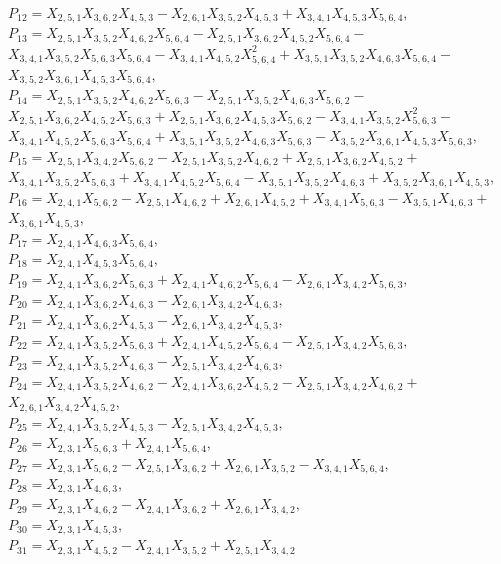\documentclass[10pt]{beamer}
\begin{document}
{$P_{12}=X_{2,5,1}X_{3,6,2}X_{4,5,3}-X_{2,6,1}X_{3,5,2}X_{4,5,3}+X_{3,4,1}X_{4,5,3}X_{5,6,4},$\\
$P_{13}=X_{2,5,1}X_{3,5,2}X_{4,6,2}X_{5,6,4}-X_{2,5,1}X_{3,6,2}X_{4,5,2}X_{5,6,4}-$\\
$X_{3,4,1}X_{3,5,2}X_{5,6,3}X_{5,6,4}-X_{3,4,1}X_{4,5,2}X_{5,6,4}^2+X_{3,5,1}X_{3,5,2}X_{4,6,3}X_{5,6,4}-$\\
$X_{3,5,2}X_{3,6,1}X_{4,5,3}X_{5,6,4},$\\
$P_{14}=X_{2,5,1}X_{3,5,2}X_{4,6,2}X_{5,6,3}-X_{2,5,1}X_{3,5,2}X_{4,6,3}X_{5,6,2}-$\\
$X_{2,5,1}X_{3,6,2}X_{4,5,2}X_{5,6,3}+X_{2,5,1}X_{3,6,2}X_{4,5,3}X_{5,6,2}-X_{3,4,1}X_{3,5,2}X_{5,6,3}^2-$\\
$X_{3,4,1}X_{4,5,2}X_{5,6,3}X_{5,6,4}+X_{3,5,1}X_{3,5,2}X_{4,6,3}X_{5,6,3}-X_{3,5,2}X_{3,6,1}X_{4,5,3}X_{5,6,3},$\\
$P_{15}=X_{2,5,1}X_{3,4,2}X_{5,6,2}-X_{2,5,1}X_{3,5,2}X_{4,6,2}+X_{2,5,1}X_{3,6,2}X_{4,5,2}+$\\
$X_{3,4,1}X_{3,5,2}X_{5,6,3}+X_{3,4,1}X_{4,5,2}X_{5,6,4}-X_{3,5,1}X_{3,5,2}X_{4,6,3}+X_{3,5,2}X_{3,6,1}X_{4,5,3},$\\
$P_{16}=X_{2,4,1}X_{5,6,2}-X_{2,5,1}X_{4,6,2}+X_{2,6,1}X_{4,5,2}+X_{3,4,1}X_{5,6,3}-X_{3,5,1}X_{4,6,3}+$\\
$X_{3,6,1}X_{4,5,3},$\\
$P_{17}=X_{2,4,1}X_{4,6,3}X_{5,6,4},$\\
$P_{18}=X_{2,4,1}X_{4,5,3}X_{5,6,4},$\\
$P_{19}=X_{2,4,1}X_{3,6,2}X_{5,6,3}+X_{2,4,1}X_{4,6,2}X_{5,6,4}-X_{2,6,1}X_{3,4,2}X_{5,6,3},$\\
$P_{20}=X_{2,4,1}X_{3,6,2}X_{4,6,3}-X_{2,6,1}X_{3,4,2}X_{4,6,3},$\\
$P_{21}=X_{2,4,1}X_{3,6,2}X_{4,5,3}-X_{2,6,1}X_{3,4,2}X_{4,5,3},$\\
$P_{22}=X_{2,4,1}X_{3,5,2}X_{5,6,3}+X_{2,4,1}X_{4,5,2}X_{5,6,4}-X_{2,5,1}X_{3,4,2}X_{5,6,3},$\\
$P_{23}=X_{2,4,1}X_{3,5,2}X_{4,6,3}-X_{2,5,1}X_{3,4,2}X_{4,6,3},$\\
$P_{24}=X_{2,4,1}X_{3,5,2}X_{4,6,2}-X_{2,4,1}X_{3,6,2}X_{4,5,2}-X_{2,5,1}X_{3,4,2}X_{4,6,2}+$\\
$X_{2,6,1}X_{3,4,2}X_{4,5,2},$\\
$P_{25}=X_{2,4,1}X_{3,5,2}X_{4,5,3}-X_{2,5,1}X_{3,4,2}X_{4,5,3},$\\
$P_{26}=X_{2,3,1}X_{5,6,3}+X_{2,4,1}X_{5,6,4},$\\
$P_{27}=X_{2,3,1}X_{5,6,2}-X_{2,5,1}X_{3,6,2}+X_{2,6,1}X_{3,5,2}-X_{3,4,1}X_{5,6,4},$\\
$P_{28}=X_{2,3,1}X_{4,6,3},$\\
$P_{29}=X_{2,3,1}X_{4,6,2}-X_{2,4,1}X_{3,6,2}+X_{2,6,1}X_{3,4,2},$\\
$P_{30}=X_{2,3,1}X_{4,5,3},$\\
$P_{31}=X_{2,3,1}X_{4,5,2}-X_{2,4,1}X_{3,5,2}+X_{2,5,1}X_{3,4,2}$\\













}
\end{document}

